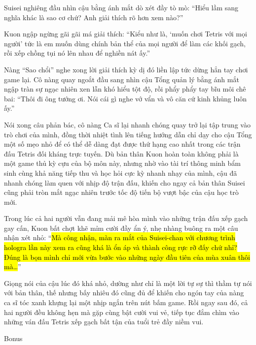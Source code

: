 \documentclass[../main.tex]{subfiles}
\begin{document}
Suisei nghiêng đầu nhìn cậu bằng ánh mắt dò xét đầy tò mò: ``Hiểu lầm sang nghĩa khác là sao cơ chứ? Anh giải thích rõ hơn xem nào?''

Kuon ngập ngừng gãi gãi má giải thích: ``Kiểu như là, `muốn chơi Tetris với mọi người' tức là em muốn dùng chính bản thể của mọi người để làm các khối gạch, rồi xếp chồng tụi nó lên nhau để nghiền nát ấy.''

Nàng ``Sao chổi'' nghe xong lời giải thích kỳ dị đó liền lập tức dừng hẳn tay chơi game lại. Cô nàng quay ngoắt đầu sang nhìn cậu Tổng quản lý bằng ánh mắt ngập tràn sự ngạc nhiên xen lẫn khó hiểu tột độ, rồi phẩy phẩy tay bĩu môi chê bai: ``Thôi đi ông tướng ơi. Nói cái gì nghe vớ vẩn và vô căn cứ kinh khủng luôn ấy.''

Nói xong câu phản bác, cô nàng Ca sĩ lại nhanh chóng quay trở lại tập trung vào trò chơi của mình, đồng thời nhiệt tình lên tiếng hướng dẫn chỉ dạy cho cậu Tổng một số mẹo nhỏ để có thể dễ dàng đạt được thứ hạng cao nhất trong các trận đấu Tetris đối kháng trực tuyến. Dù bản thân Kuon hoàn toàn không phải là một game thủ kỳ cựu của bộ môn này, nhưng nhờ vào tài trí thông minh bẩm sinh cùng khả năng tiếp thu và học hỏi cực kỳ nhanh nhạy của mình, cậu đã nhanh chóng làm quen với nhịp độ trận đấu, khiến cho ngay cả bản thân Suisei cũng phải tròn mắt ngạc nhiên trước tốc độ tiến bộ vượt bậc của cậu học trò mới.

Trong lúc cả hai người vẫn đang mải mê hòa mình vào những trận đấu xếp gạch gay cấn, Kuon bất chợt khẽ mỉm cười đầy ẩn ý, nhẹ nhàng buông ra một câu nhận xét nhỏ: ``\hl{Mà công nhận, màn ra mắt của Suisei-chan với chương trình hologra lần này xem ra cũng khá là ổn áp và thành công rực rỡ đấy chứ nhỉ? Đúng là bọn mình chỉ mới vừa bước vào những ngày đầu tiên của mùa xuân thôi mà\dots}''

Giọng nói của cậu lúc đó khá nhỏ, dường như chỉ là một lời tự sự thì thầm tự nói với bản thân, thế nhưng bấy nhiêu đó cũng đủ để khiến cho ngón tay của nàng ca sĩ tóc xanh khựng lại một nhịp ngắn trên nút bấm game. Rồi ngay sau đó, cả hai người đều không hẹn mà gặp cùng bật cười vui vẻ, tiếp tục đắm chìm vào những ván đấu Tetris xếp gạch bất tận của tuổi trẻ đầy niềm vui.

\begin{center}
  {\abv\Large Bonus}
\end{center}

\end{document}
